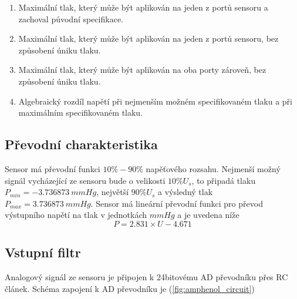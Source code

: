 \begin{table}[H]
\begin{ctucolortab}
    \end{ctucolortab}
    \begin{enumerate}
        \item \label{enum:amp_proof_pressure} Maximální tlak, který může být aplikován na jeden z portů sensoru a zachoval původní specifikace.
        \item \label{enum:amp_burst_pressure} Maximální tlak, který může být aplikován na jeden z portů sensoru, bez způsobení úniku tlaku.
        \item \label{enum:amp_common_pressure} Maximální tlak, který může být aplikován na oba porty zároveň, bez způsobení úniku tlaku.
        \item \label{enum:amp_fss} Algebraický rozdíl napětí při nejmenším možném specifikovaném tlaku a při maximálním specifikovaném tlaku.
    \end{enumerate}
\end{table}
\subsection{Převodní charakteristika}
Sensor má převodní funkci $10 \% - 90 \%$ napěťového rozsahu. Nejmenší možný signál vycházející ze sensoru bude o velikosti $10\% U_s$,
to připadá tlaku $P_{min} = -3.736873 \ mmHg$, největší $90\% U_s$ a výsledný tlak $P_{max} = 3.736873 \ mmHg$.
Sensor má lineární převodní funkci pro převod výstupního napětí na tlak v jednotkách $mmHg$ a je uvedena níže
\begin{equation}
    P = 2.831 \times U - 4.671
\end{equation}
\subsection{Vstupní filtr}
Analogový signál ze sensoru je připojen k 24bitovému AD převodníku přes RC článek. Schéma zapojení k AD převodníku je (\ref{fig:amphenol_circuit})

